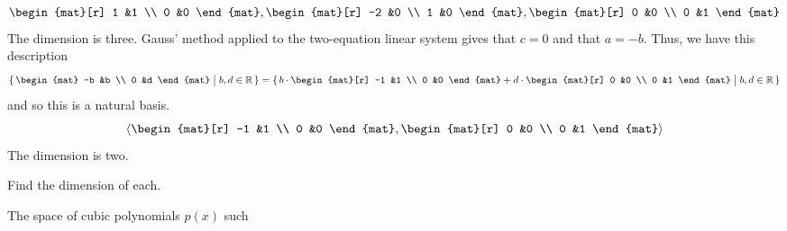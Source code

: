 \begin{exercises}
\begin{answer}
\begin{exparts}
\begin{equation*}
{\begin{mat}[r]
              1  &1  \\
              0  &0
            \end{mat},
            \begin{mat}[r]
              -2  &0  \\
               1  &0
            \end{mat},
            \begin{mat}[r]
              0  &0  \\
              0  &1
            \end{mat}  }
        \end{equation*}
        The dimension is three. 
      \partsitem Gauss' method applied to the two-equation linear system gives
        that $c=0$ and that $a=-b$.
        Thus, we have this description
        \begin{equation*}
         \set{\begin{mat}
               -b  &b  \\
                0  &d
             \end{mat} \suchthat b,d\in\Re}
         =\set{b\cdot\begin{mat}[r]
             -1  &1  \\
             0  &0
           \end{mat}
           +d\cdot\begin{mat}[r]
             0  &0  \\
             0  &1
           \end{mat} \suchthat b,d\in\Re}
        \end{equation*}
        and so this is a natural basis.
        \begin{equation*}
          \sequence{
            \begin{mat}[r]
              -1  &1  \\
               0  &0
            \end{mat},
            \begin{mat}[r]
              0  &0  \\
              0  &1
            \end{mat}  }
        \end{equation*}
        The dimension is two. 
     \end{exparts} 
    \end{answer}
  \recommended \item 
    Find the dimension of each.
    \begin{exparts}
      \partsitem  The space of cubic polynomials $p(x)$ such

\end{exparts}
\end{exercises}
